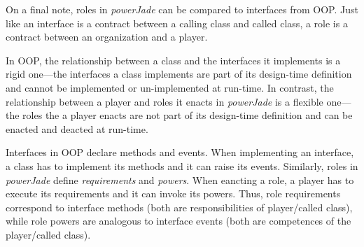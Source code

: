 On a final note, roles in \textit{powerJade} can be compared to interfaces from OOP.
Just like an interface is a contract between a calling class and called class, a role is a contract between an organization and a player.

In OOP, the relationship between a class and the interfaces it implements is a rigid one---the interfaces a class implements are part of its design-time definition and cannot be implemented or un-implemented at run-time.
In contrast, the relationship between a player and roles it enacts in \textit{powerJade} is a flexible one---the roles the a player enacts are not part of its design-time definition and can be enacted and deacted at run-time.

Interfaces in OOP declare methods and events.
When implementing an interface, a class has to implement its methods and it can raise its events.
Similarly, roles in \textit{powerJade} define \textit{requirements} and \textit{powers}.
When eancting a role, a player has to execute its requirements and it can invoke its powers.
Thus, role requirements correspond to interface methods (both are responsibilities of player/called class), while role powers are analogous to interface events (both are competences of the player/called class).